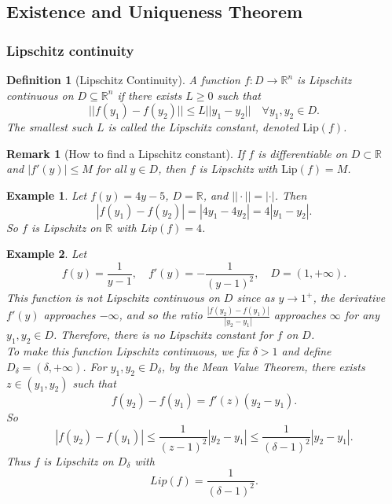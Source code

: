 \documentclass{article}
\newtheorem{definition}{Definition}
\newtheorem*{example}{Example}
\newtheorem{remark}{Remark}
\newcommand{\R}{\mathbb{R}}
\begin{document}
\subsection{Existence and Uniqueness Theorem}
\subsubsection{Lipschitz continuity}
\begin{definition}[Lipschitz Continuity]
    A function $f : D \to \R^n$ is Lipschitz continuous on $D \subseteq \R^n$ if there exists $L \geq 0$ such that
    \[||f(y_1) - f(y_2)|| \le L||y_1 - y_2|| \quad \forall y_1,y_2 \in D.\]
    The smallest such $L$ is called the Lipschitz constant, denoted $\mathrm{Lip}(f)$.
\end{definition}
\begin{remark}[How to find a Lipschitz constant]
    If $f$ is differentiable on $D \subset \R$ and 
    $|f'(y)| \leq M$ for all $y \in D$, then $f$ is Lipschitz with 
    $\mathrm{Lip}(f) = M$.
\end{remark}
\begin{example}
    Let \(f(y) = 4y - 5\), \(D = \R\), and \(||\cdot|| = |\cdot|\).
    Then
    \[|f(y_1) - f(y_2)| = |4y_1 - 4y_2| = 4|y_1 - y_2|.\]
    So \(f\) is Lipschitz on \(\R\) with \(Lip(f) = 4\).
\end{example}
\begin{example}
    Let
    \[f(y) = \frac{1}{y - 1}, \quad f'(y) = -\frac{1}{(y - 1)^2}, \quad D = (1, +\infty).\]
    This function is not Lipschitz continuous on \(D\) since as \(y \to 1^+\), the derivative \(f'(y)\) approaches \(-\infty\), and so the ratio \(\frac{|f(y_2) - f(y_1)|}{|y_2 - y_1|}\) approaches \(\infty\) for any \(y_1,y_2 \in D\). Therefore, there is no Lipschitz constant for \(f\) on \(D\).\\
    To make this function Lipschitz continuous, we fix \(\delta > 1\) and define \(D_\delta = (\delta, +\infty)\). For \(y_1,y_2 \in D_\delta\), by the Mean Value Theorem, there exists \(z \in (y_1,y_2)\) such that
    \[f(y_2) - f(y_1) = f'(z)(y_2 - y_1).\]
    So
    \[|f(y_2) - f(y_1)| \le \frac{1}{(z-1)^2}|y_2 - y_1|\le \frac{1}{(\delta-1)^2}|y_2 - y_1|.\]
    Thus \(f\) is Lipschitz on \(D_\delta\) with
    \[Lip(f) = \frac{1}{(\delta - 1)^2}.\]
\end{example}
\end{document}
